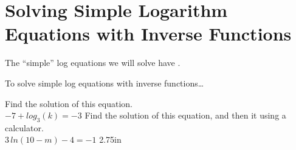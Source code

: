 \section{Solving Simple Logarithm Equations with Inverse Functions}

\begin{tcolorbox}[center,width=3.75in,colback=white,]
    The ``simple'' log equations we will solve have  .
\end{tcolorbox}

\begin{myConceptSteps}{To solve simple log equations with inverse functions\dots}
\end{myConceptSteps}

\myProblems
{
    Find the  solution of this equation.\\[0.5\onelineskip]
    $ -7 + log_3(k) = -3 $
}
{
    Find the  solution of this equation, and then  it using a calculator.\\[0.5\onelineskip]
    $ 3 \, ln(10-m) - 4 = -1 $
}
{2.75in}
